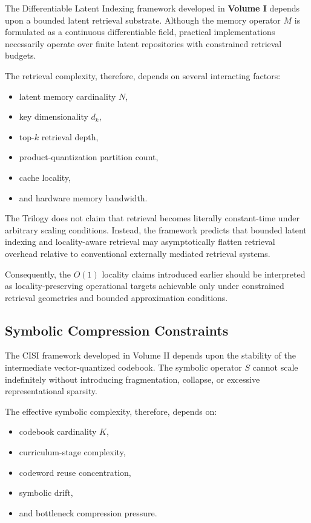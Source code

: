 The Differentiable Latent Indexing framework developed in \textbf{Volume I} depends upon a bounded latent retrieval substrate. Although the memory operator \(M\) is formulated as a continuous differentiable field, practical implementations necessarily operate over finite latent repositories with constrained retrieval budgets.

The retrieval complexity, therefore, depends on several interacting factors:

\begin{itemize}
    \item latent memory cardinality \(N\),
    \item key dimensionality \(d_k\),
    \item top-\(k\) retrieval depth,
    \item product-quantization partition count,
    \item cache locality,
    \item and hardware memory bandwidth.
\end{itemize}

The Trilogy does not claim that retrieval becomes literally constant-time under arbitrary scaling conditions. Instead, the framework predicts that bounded latent indexing and locality-aware retrieval may asymptotically flatten retrieval overhead relative to conventional externally mediated retrieval systems.

Consequently, the \(O(1)\) locality claims introduced earlier should be interpreted as locality-preserving operational targets achievable only under constrained retrieval geometries and bounded approximation conditions.

\subsection*{Symbolic Compression Constraints}

The CISI framework developed in Volume II depends upon the stability of the intermediate vector-quantized codebook. The symbolic operator \(S\) cannot scale indefinitely without introducing fragmentation, collapse, or excessive representational sparsity.

The effective symbolic complexity, therefore, depends on:

\begin{itemize}
    \item codebook cardinality \(K\),
    \item curriculum-stage complexity,
    \item codeword reuse concentration,
    \item symbolic drift,
    \item and bottleneck compression pressure.
\end{itemize}

